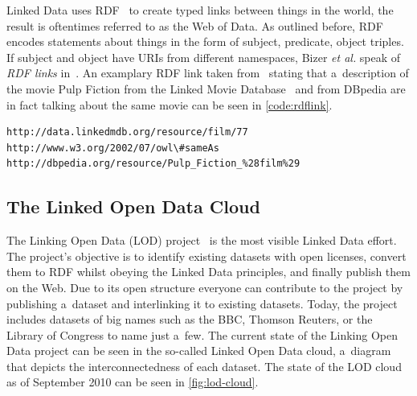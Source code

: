 Linked Data uses RDF~\cite{Klyne2004} to create typed links between things in the world,
the result is oftentimes referred to as the Web of Data.
As outlined before, RDF encodes statements about things in the form of
subject, predicate, object triples.
If subject and object have URIs from different namespaces,
Bizer \emph{et al.} speak of \emph{RDF links} in~\cite{Bizer2007}.
An examplary RDF link taken from~\cite{Bizer2009} stating that a~description of the movie Pulp Fiction
from the Linked Movie Database~\cite{Hassanzadeh2009} and from DBpedia are in fact talking about the same movie
can be seen in \autoref{code:rdflink}.

\begin{lstlisting}[caption={[Exemplary RDF link.]{Exemplary RDF link stating that a~description of the movie Pulp Fiction from the Linked Movie Database~\cite{Hassanzadeh2009} and from DBpedia are in fact talking about the same movie.}},label={code:rdflink}]
http://data.linkedmdb.org/resource/film/77
http://www.w3.org/2002/07/owl\#sameAs
http://dbpedia.org/resource/Pulp_Fiction_%28film%29
\end{lstlisting}

\subsection{The Linked Open Data Cloud}\label{sec:lodcloud}
The Linking Open Data (LOD) project~\cite{Bizer2011} is the most visible Linked Data effort.
The project’s objective is to identify existing datasets with open licenses,
convert them to RDF whilst obeying the Linked Data principles, and finally publish them on the Web.
Due to its open structure everyone can contribute to the project by publishing a~dataset and
interlinking it to existing datasets.
Today, the project includes datasets of big names such as the BBC, Thomson Reuters,
or the Library of Congress to name just a~few.
The current state of the Linking Open Data project can be seen in the so-called Linked Open Data cloud,
a~diagram that depicts the interconnectedness of each dataset.
The state of the LOD cloud as of September 2010 can be seen in \autoref{fig:lod-cloud}.

